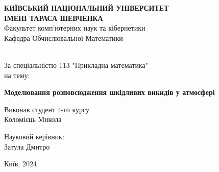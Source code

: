 \begin{titlepage}
    \begin{center}
        \large \textbf{КИЇВСЬКИЙ НАЦІОНАЛЬНИЙ УНІВЕРСИТЕТ \\
            ІМЕНІ ТАРАСА ШЕВЧЕНКА} \\

        \vspace{0.5cm}
        Факультет комп’ютерних наук та кібернетики \\
        Кафедра Обчислювальної Математики
        \vspace{2.5cm}
        \vfill

        \\[2mm]

        За спеціальністю 113 "Прикладна математика" \\
        на тему:

        \vfill

        {\LARGE \textbf{Моделювання розповсюдження шкідливих викидів у атмосфері}}
        \bigskip
        \vspace{6cm}

    \end{center}
    \vfill

    \newlength{\ML}
    \settowidth{\ML}{}
    \begin{minipage}{0.5\textwidth}
        Виконав студент 4-го курсу \\
        Коломієць Микола
    \end{minipage}%
    \bigskip

    \begin{minipage}{0.5\textwidth}
        Науковий керівник:\\
        Затула Дмитро
    \end{minipage}%
    \vfill

    \vspace{2cm}

    \begin{center}
        Київ, 2024
    \end{center}

\end{titlepage}

